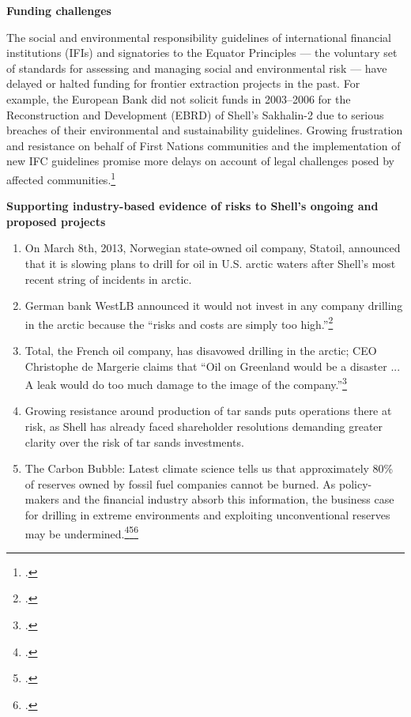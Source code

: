 \textbf{Funding challenges}



The social and environmental responsibility guidelines of international financial institutions (IFIs) and signatories to the Equator Principles --- the voluntary set of standards for assessing and managing social and environmental risk --- have delayed or halted funding for frontier extraction projects in the past. 
For example, the European Bank did not solicit funds in 2003--2006 for the Reconstruction and Development (EBRD) of Shell's Sakhalin-2 due to serious breaches of their environmental and sustainability guidelines. 
Growing frustration and resistance on behalf of First Nations communities and the implementation of new IFC guidelines promise more delays on account of legal challenges posed by affected communities.\footcite[][]{Mathiason_2005}



\textbf{Supporting industry-based evidence of risks to Shell's ongoing and proposed projects}



\begin{enumerate}
	\item On March 8th, 2013, Norwegian state-owned oil company, Statoil, announced that it is slowing plans to drill for oil in U.S. arctic waters after Shell's most recent string of incidents in arctic.
	\item German bank WestLB announced it would not invest in any company drilling in the arctic because the ``risks and costs are simply too high.''\footcite[][]{Naidoo_2012}
	\item Total, the French oil company, has disavowed drilling in the arctic; CEO Christophe de Margerie claims that ``Oil on Greenland would be a disaster ... A leak would do too much damage to the image of the company.''\footcite[][]{NewsWire_2012}
	\item Growing resistance around production of tar sands puts operations there at risk, as Shell has already faced shareholder resolutions demanding greater clarity over the risk of tar sands investments.
	\item The Carbon Bubble: Latest climate science tells us that approximately 80\% of reserves owned by fossil fuel companies cannot be burned. As policy-makers and the financial industry absorb this information, the business case for drilling in extreme environments and exploiting unconventional reserves may be undermined.\footcite[][]{carbontracker}\footcite[][]{UNEP_2009}\footcite[][]{HSBC_2013}
\end{enumerate}



